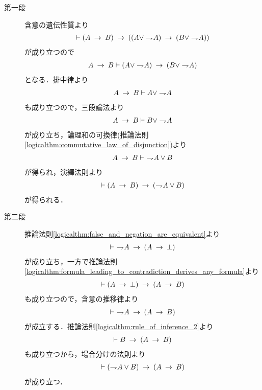 	\begin{prf}\mbox{}
		\begin{description}
			\item[第一段]
				含意の遺伝性質より
				\begin{align}
					\vdash (A \rarrow B) \rarrow 
					((A \vee \negation A) \rarrow (B \vee \negation A))
				\end{align}
				が成り立つので
				\begin{align}
					A \rarrow B \vdash (A \vee \negation A) \rarrow (B \vee \negation A)
				\end{align}
				となる．排中律より
				\begin{align}
					A \rarrow B \vdash A \vee \negation A
				\end{align}
				も成り立つので，三段論法より
				\begin{align}
					A \rarrow B \vdash B \vee \negation A
				\end{align}
				が成り立ち，論理和の可換律(推論法則\ref{logicalthm:commutative_law_of_disjunction})より
				\begin{align}
					A \rarrow B \vdash\ \negation A \vee B
				\end{align}
				が得られ，演繹法則より
				\begin{align}
					\vdash (A \rarrow B) \rarrow (\negation A \vee B)
				\end{align}
				が得られる．
				
			\item[第二段]
				推論法則\ref{logicalthm:false_and_negation_are_equivalent}より
				\begin{align}
					\vdash\ \negation A \rarrow (A \rarrow \bot)
				\end{align}
				が成り立ち，一方で推論法則\ref{logicalthm:formula_leading_to_contradiction_derives_any_formula}より
				\begin{align}
					\vdash (A \rarrow \bot) \rarrow (A \rarrow B)
				\end{align}
				も成り立つので，含意の推移律より
				\begin{align}
					\vdash\ \negation A \rarrow (A \rarrow B)
				\end{align}
				が成立する．推論法則\ref{logicalthm:rule_of_inference_2}より
				\begin{align}
					\vdash B \rarrow (A \rarrow B)
				\end{align}
				も成り立つから，場合分けの法則より
				\begin{align}
					\vdash (\negation A \vee B) \rarrow (A \rarrow B)
				\end{align}
				が成り立つ．
				\QED
		\end{description}
	\end{prf}
	
